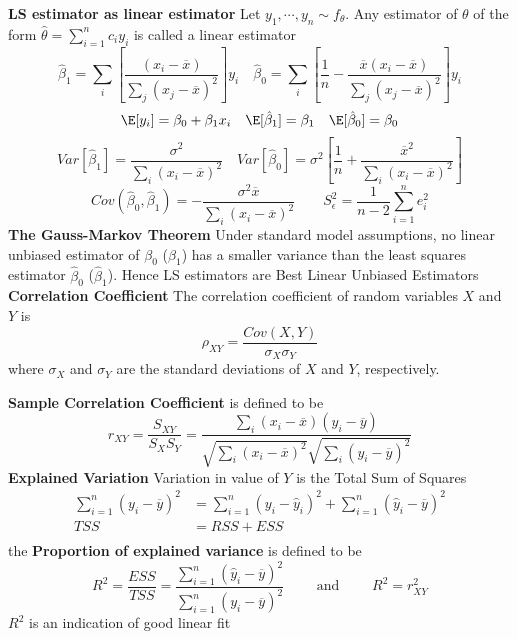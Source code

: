 \documentclass[8pt]{article}
\begin{document}
\begin{multicols}{3}
{    \textbf{LS estimator as linear estimator} Let $y_1, \cdots, y_n\sim f_{\theta}$. Any estimator of $\theta$ of the form $\hat{\theta} = \sum_{i=1}^n c_i y_i$ is called a linear estimator
    \[
      \hat{\beta}_1 = \sum_i \left[\frac{ (x_i - \overline{x})}{\sum_j (x_j - \overline{x})^2} \right] y_i \quad
      \hat{\beta}_0 = \sum_i \left[ \frac{1}{n} - \frac{\overline{x}(x_i - \overline{x})}{\sum_j (x_j - \overline{x})^2} \right]y_i
    \]
    \[
      \E[y_i] = \beta_0 + \beta_1 x_i \quad \E[\hat{\beta}_1] = \beta_1 \quad \E[\hat{\beta}_0] = \beta_0
    \]
    \[
      Var[\hat{\beta}_1] = \frac{\sigma^2}{\sum_i (x_i - \overline{x} )^2} \quad Var[\hat{\beta}_0] = \sigma^2 \left[ \frac{1}{n} + \frac{\overline{x}^2}{\sum_i (x_i - \overline{x})^2} \right]
    \]
    \[
      Cov(\hat{\beta}_0, \hat{\beta}_1) = -\frac{\sigma^2 \overline{x}}{ \sum_i (x_i - \overline{x})^2} \quad \quad S^2_{\epsilon} = \frac{1}{n - 2} \sum_{i=1}^n e_i^2
    \]
    \textbf{The Gauss-Markov Theorem} Under standard model assumptions, no linear unbiased estimator of $\beta_0$ ($\beta_1$) has a smaller variance than the least squares estimator $\hat{\beta}_0$ ($\hat{\beta}_1$). Hence LS estimators are Best Linear Unbiased Estimators\\
    \textbf{Correlation Coefficient} The correlation coefficient of random variables $X$ and $Y$ is
    \[
      \rho_{XY} = \frac{Cov(X, Y)}{\sigma_X \sigma_Y}
    \]
    where $\sigma_X$ and $\sigma_Y$ are the standard deviations of $X$ and $Y$, respectively.\\
    \item \textbf{Sample Correlation Coefficient} is defined to be
    \[
      r_{XY} = \frac{S_{XY}}{S_X S_Y} = \frac{\sum_i (x_i - \overline{x}) (y_i - \overline{y}) }{ \sqrt{ \sum_i (x_i - \overline{x})^2  }  \sqrt{ \sum_i (y_i - \overline{y})^2  } }
    \]
    \textbf{Explained Variation} Variation in value of $Y$ is the Total Sum of Squares
    \begin{align*}
      \sum_{i=1}^n (y_i - \overline{y})^2 &= \sum_{i=1}^n (y_i - \hat{y}_i)^2 + \sum_{i=1}^n (\hat{y}_i - \overline{y})^2\\
      TSS &= RSS + ESS\\
    \end{align*}
    the \textbf{Proportion of explained variance} is defined to be
    \[
      R^2 = \frac{ESS}{TSS} = \frac{ \sum_{i=1}^n (\hat{y}_i - \overline{y})^2 }{ \sum_{i=1}^n (y_i - \overline{y})^2} \quad \quad \text{ and }  \quad\quad  R^2 = r_{XY}^2
    \]
    $R^2$ is an indication of good linear fit\\
}
\end{multicols}
\end{document}
